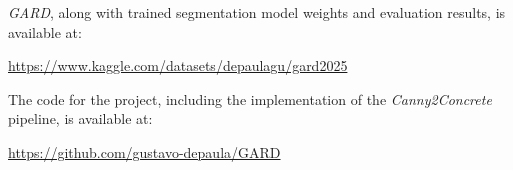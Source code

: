 \emph{GARD}, along with trained segmentation model weights and evaluation results, is available at:
\begin{center}
\url{https://www.kaggle.com/datasets/depaulagu/gard2025}
\end{center}

The code for the project, including the implementation of the \emph{Canny2Concrete} pipeline, is available at:
\begin{center}
\url{https://github.com/gustavo-depaula/GARD}
\end{center}


\endgroup

